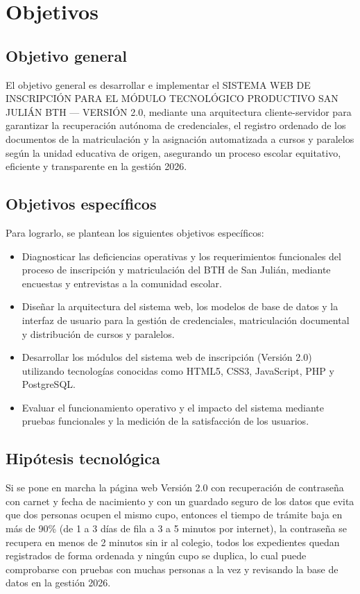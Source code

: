 \section{Objetivos}
\label{sec:objetivos}

\subsection{Objetivo general}

El objetivo general es desarrollar e implementar el SISTEMA WEB DE INSCRIPCIÓN PARA EL MÓDULO TECNOLÓGICO PRODUCTIVO SAN JULIÁN BTH --- VERSIÓN 2.0, mediante una arquitectura cliente-servidor para garantizar la recuperación autónoma de credenciales, el registro ordenado de los documentos de la matriculación y la asignación automatizada a cursos y paralelos según la unidad educativa de origen, asegurando un proceso escolar equitativo, eficiente y transparente en la gestión 2026.

\subsection{Objetivos específicos}

Para lograrlo, se plantean los siguientes objetivos específicos:

\begin{itemize}
    \item Diagnosticar las deficiencias operativas y los requerimientos funcionales del proceso de inscripción y matriculación del BTH de San Julián, mediante encuestas y entrevistas a la comunidad escolar.
    \item Diseñar la arquitectura del sistema web, los modelos de base de datos y la interfaz de usuario para la gestión de credenciales, matriculación documental y distribución de cursos y paralelos.
    \item Desarrollar los módulos del sistema web de inscripción (Versión 2.0) utilizando tecnologías conocidas como HTML5, CSS3, JavaScript, PHP y PostgreSQL.
    \item Evaluar el funcionamiento operativo y el impacto del sistema mediante pruebas funcionales y la medición de la satisfacción de los usuarios.
\end{itemize}

\subsection{Hipótesis tecnológica}

Si se pone en marcha la página web Versión 2.0 con recuperación de contraseña con carnet y fecha de nacimiento y con un guardado seguro de los datos que evita que dos personas ocupen el mismo cupo, entonces el tiempo de trámite baja en más de 90\% (de 1 a 3 días de fila a 3 a 5 minutos por internet), la contraseña se recupera en menos de 2 minutos sin ir al colegio, todos los expedientes quedan registrados de forma ordenada y ningún cupo se duplica, lo cual puede comprobarse con pruebas con muchas personas a la vez y revisando la base de datos en la gestión 2026.
